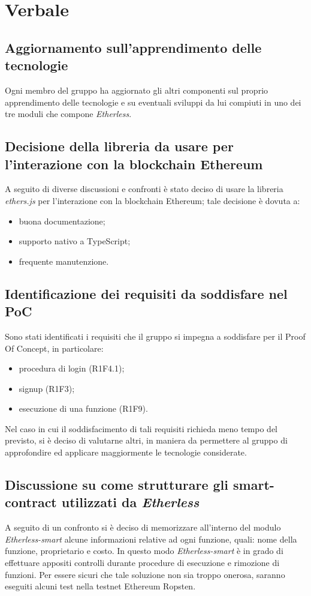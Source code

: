 \section{Verbale}

	\subsection{Aggiornamento sull'apprendimento delle tecnologie}
	Ogni membro del gruppo ha aggiornato gli altri componenti sul proprio apprendimento delle tecnologie e su eventuali sviluppi da lui compiuti in uno dei tre moduli che compone \textit{Etherless}. 
	
	\subsection{Decisione della libreria da usare per l'interazione con la blockchain Ethereum}
	A seguito di diverse discussioni e confronti è stato deciso di usare la libreria \textit{ethers.js} per l'interazione con la blockchain Ethereum; tale decisione è dovuta a: 
		\begin{itemize}
			\item buona documentazione; 
			\item supporto nativo a TypeScript; 
			\item frequente manutenzione. 
		\end{itemize}

	\subsection{Identificazione dei requisiti da soddisfare nel PoC}
	Sono stati identificati i requisiti che il gruppo si impegna a soddisfare per il Proof Of Concept, 
	in particolare: 
		\begin{itemize}
			\item procedura di login (R1F4.1); 
			\item signup (R1F3); 
			\item esecuzione di una funzione (R1F9). 
		\end{itemize}
	Nel caso in cui il soddisfacimento di tali requisiti richieda meno tempo del previsto, si è deciso di valutarne altri, in maniera da permettere al gruppo di approfondire ed applicare maggiormente le tecnologie considerate. 
	
	\subsection{Discussione su come strutturare gli smart-contract utilizzati da \textit{Etherless}}
	A seguito di un confronto si è deciso di memorizzare all'interno del modulo \textit{Etherless-smart} alcune informazioni relative ad ogni funzione, quali: nome della funzione, proprietario e costo. In questo modo \textit{Etherless-smart} è in grado di effettuare appositi controlli durante procedure di esecuzione e rimozione di funzioni. 
	Per essere sicuri che tale soluzione non sia troppo onerosa, saranno eseguiti alcuni test nella testnet Ethereum Ropsten. 
	
